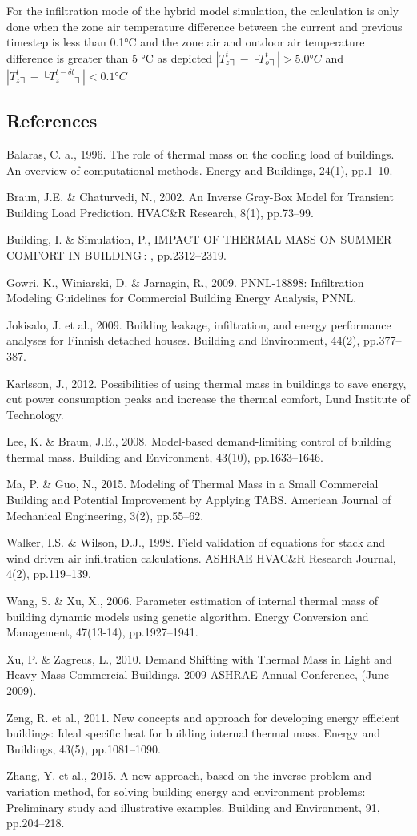 For the infiltration mode of the hybrid model simulation, the calculation is only done when the zone air temperature difference between the current and previous timestep is less than 0.1°C and the zone air and outdoor air temperature difference is greater than 5 °C as depicted $|T_z^t ┤-├ T_o^t ┤|>5.0 °C$ and $|T_z^t ┤-├ T_z^{t-δt} ┤|<0.1°C$

\subsection{References}\label{references}

Balaras, C. a., 1996. The role of thermal mass on the cooling load of buildings. An overview of computational methods. Energy and Buildings, 24(1), pp.1–10.

Braun, J.E. \& Chaturvedi, N., 2002. An Inverse Gray-Box Model for Transient Building Load Prediction. HVAC\&R Research, 8(1), pp.73–99.

Building, I. \& Simulation, P., IMPACT OF THERMAL MASS ON SUMMER COMFORT IN BUILDING : , pp.2312–2319.

Gowri, K., Winiarski, D. \& Jarnagin, R., 2009. PNNL-18898: Infiltration Modeling Guidelines for Commercial Building Energy Analysis, PNNL.

Jokisalo, J. et al., 2009. Building leakage, infiltration, and energy performance analyses for Finnish detached houses. Building and Environment, 44(2), pp.377–387.

Karlsson, J., 2012. Possibilities of using thermal mass in buildings to save energy, cut power consumption peaks and increase the thermal comfort, Lund Institute of Technology.

Lee, K. \& Braun, J.E., 2008. Model-based demand-limiting control of building thermal mass. Building and Environment, 43(10), pp.1633–1646.

Ma, P. \& Guo, N., 2015. Modeling of Thermal Mass in a Small Commercial Building and Potential Improvement by Applying TABS. American Journal of Mechanical Engineering, 3(2), pp.55–62.

Walker, I.S. \& Wilson, D.J., 1998. Field validation of equations for stack and wind driven air infiltration calculations. ASHRAE HVAC\&R Research Journal, 4(2), pp.119–139.

Wang, S. \& Xu, X., 2006. Parameter estimation of internal thermal mass of building dynamic models using genetic algorithm. Energy Conversion and Management, 47(13-14), pp.1927–1941.

Xu, P. \& Zagreus, L., 2010. Demand Shifting with Thermal Mass in Light and Heavy Mass Commercial Buildings. 2009 ASHRAE Annual Conference, (June 2009).

Zeng, R. et al., 2011. New concepts and approach for developing energy efficient buildings: Ideal specific heat for building internal thermal mass. Energy and Buildings, 43(5), pp.1081–1090.

Zhang, Y. et al., 2015. A new approach, based on the inverse problem and variation method, for solving building energy and environment problems: Preliminary study and illustrative examples. Building and Environment, 91, pp.204–218.
